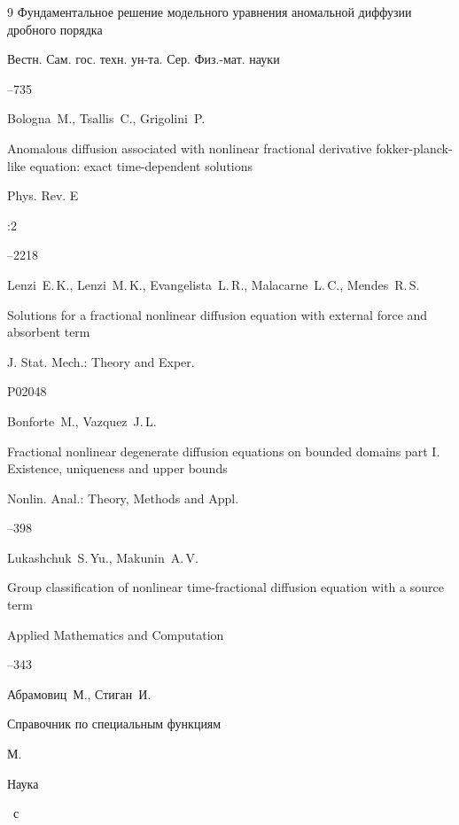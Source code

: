 \begin{thebibliography}{9}
\paper Фундаментальное решение модельного уравнения аномальной диффузии дробного порядка

\jour Вестн. Сам. гос. техн. ун-та. Сер. Физ.-мат. науки



--735

	


\by Bologna~M., Tsallis~C., Grigolini~P.

\paper Anomalous diffusion associated with nonlinear fractional derivative fokker-planck-like equation: exact time-dependent solutions

\jour Phys. Rev. E


:2

--2218

	


\by Lenzi~E.\,K., Lenzi~M.\,K., Evangelista~L.\,R., Malacarne~L.\,C., Mendes~R.\,S.

\paper Solutions for a fractional nonlinear diffusion equation with external force and absorbent term

\jour J. Stat. Mech.: Theory and Exper.



\pages P02048

	


\by Bonforte~M., Vazquez~J.\,L.

\paper Fractional nonlinear degenerate diffusion equations on bounded domains part I. Existence, uniqueness and upper bounds

\jour Nonlin. Anal.: Theory, Methods and Appl.



--398

	


\by Lukashchuk~S.\,Yu., Makunin~A.\,V.

\paper Group classification of nonlinear time-fractional diffusion equation with a source term

\jour Applied Mathematics and Computation



--343




\by Абрамовиц~М.,  Стиган~И.

\book Справочник по специальным функциям

\publaddr М.

\publ Наука


~с

	

\end{thebibliography}
